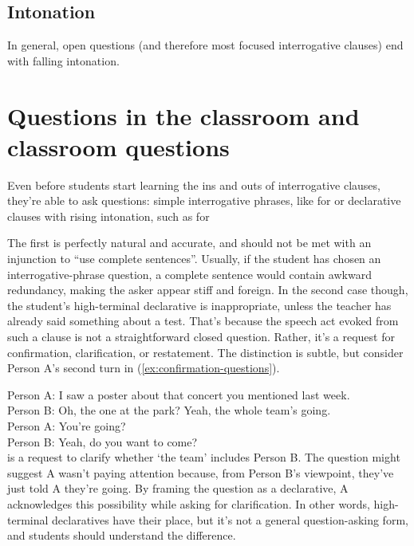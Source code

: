 \subsection{Intonation}

In general, open questions (and therefore most focused interrogative clauses) end with falling intonation.

\section{Questions in the classroom and classroom questions}

Even before students start learning the ins and outs of interrogative clauses, they're able to ask questions: simple interrogative phrases, like  for  or declarative clauses with rising intonation, such as  for 

The first is perfectly natural and accurate, and should not be met with an injunction to \enquote{use complete sentences}. Usually, if the student has chosen an interrogative-phrase question, a complete sentence would contain awkward redundancy, making the asker appear stiff and foreign. In the second case though, the student's high-terminal declarative is inappropriate, unless the teacher has already said something about a test. That's because the speech act evoked from such a clause is not a straightforward closed question. Rather, it's a request for confirmation, clarification, or restatement. The distinction is subtle, but consider Person A's second turn in (\ref{ex:confirmation-questions}).

\ea \label{ex:confirmation-questions}
    Person A: I saw a poster about that concert you mentioned last week. \\
    Person B: Oh, the one at the park? Yeah, the whole team's going. \\
    Person A: You're going? \\
    Person B: Yeah, do you want to come? \\
\z
  is a request to clarify whether `the team' includes Person B. The question  might suggest A wasn't paying attention because, from Person B's viewpoint, they've just told A they're going. By framing the question as a declarative, A acknowledges this possibility while asking for clarification. In other words, high-terminal declaratives have their place, but it's not a general question-asking form, and students should understand the difference.

